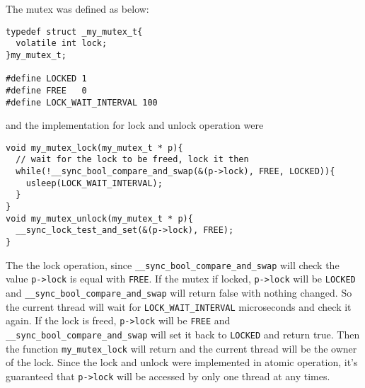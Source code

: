 \documentclass[12pt]{article}
\begin{document}
The mutex was defined as below:
\begin{verbatim}
typedef struct _my_mutex_t{
  volatile int lock;
}my_mutex_t;

#define LOCKED 1
#define FREE   0
#define LOCK_WAIT_INTERVAL 100
\end{verbatim}
and the implementation for lock and unlock operation were
\begin{verbatim}
void my_mutex_lock(my_mutex_t * p){
  // wait for the lock to be freed, lock it then
  while(!__sync_bool_compare_and_swap(&(p->lock), FREE, LOCKED)){
    usleep(LOCK_WAIT_INTERVAL);
  }
}
void my_mutex_unlock(my_mutex_t * p){
  __sync_lock_test_and_set(&(p->lock), FREE);
}
\end{verbatim}
The the lock operation, since \texttt{\_\_sync\_bool\_compare\_and\_swap} 
will check the value \texttt{p->lock} is equal with \texttt{FREE}. 
If the mutex if locked, \texttt{p->lock} will be \texttt{LOCKED} and
\texttt{\_\_sync\_bool\_compare\_and\_swap} will return false with nothing
changed. So the current thread will wait for \texttt{LOCK\_WAIT\_INTERVAL}
microseconds and check it again. If the lock is freed, \texttt{p->lock} 
will be \texttt{FREE} and \texttt{\_\_sync\_bool\_compare\_and\_swap} will 
set it back to \texttt{LOCKED} and return true. Then the function
\texttt{my\_mutex\_lock} will return and the current thread will be the 
owner of the lock. Since the lock and unlock were implemented in atomic 
operation, it's guaranteed that \texttt{p->lock} will be accessed by only one
thread at any times. 
\end{document}
